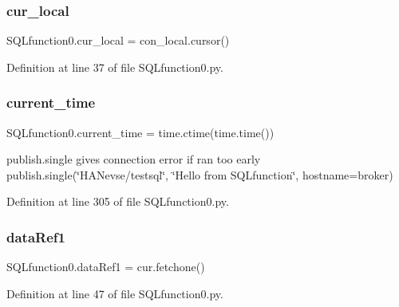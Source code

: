 \mbox{\label{namespace_s_q_lfunction0_a262b8e2310d06be84bb653d1348b0993}} 
\subsubsection{cur\+\_\+local}
{\footnotesize\ttfamily S\+Q\+Lfunction0.\+cur\+\_\+local = con\+\_\+local.\+cursor()}



Definition at line 37 of file S\+Q\+Lfunction0.\+py.

\mbox{\label{namespace_s_q_lfunction0_a2d781d1428b26d7f4672104b29e77f61}} 
\subsubsection{current\+\_\+time}
{\footnotesize\ttfamily S\+Q\+Lfunction0.\+current\+\_\+time = time.\+ctime(time.\+time())}



publish.\+single gives connection error if ran too early publish.\+single(\char`\"{}\+H\+A\+Nevse/testsql\char`\"{}, \char`\"{}\+Hello from S\+Q\+Lfunction\char`\"{}, hostname=broker) 



Definition at line 305 of file S\+Q\+Lfunction0.\+py.

\mbox{\label{namespace_s_q_lfunction0_a079742e0b1a952fc11e3f5c1ff11f088}} 
\subsubsection{data\+Ref1}
{\footnotesize\ttfamily S\+Q\+Lfunction0.\+data\+Ref1 = cur.\+fetchone()}



Definition at line 47 of file S\+Q\+Lfunction0.\+py.

\mbox{\label{namespace_s_q_lfunction0_a152076215c881c27bf09a5883ff02445}} 
